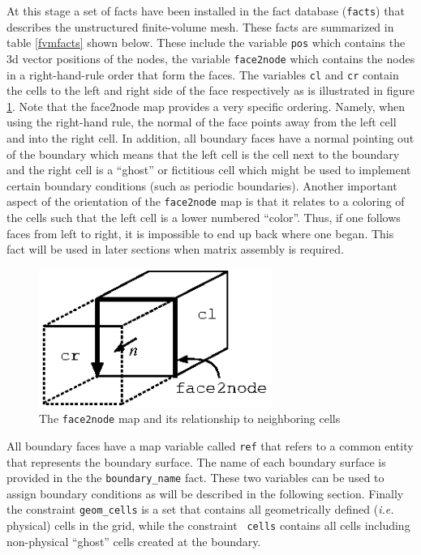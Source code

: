 \documentclass[10pt,epsf,letterpaper,twoside]{book}
\begin{document}
At this stage a set of facts have been installed in the fact database
({\tt facts}) that describes the unstructured finite-volume mesh.
These facts are summarized in table \ref{fvmfacts} shown below.  These
include the variable {\tt pos} which contains the 3d vector positions
of the nodes, the variable {\tt face2node} which contains the nodes in
a right-hand-rule order that form the faces.  The variables {\tt cl}
and {\tt cr} contain the cells to the left and right side of the face
respectively as is illustrated in figure \ref{face2node}.  Note that
the face2node map provides a very specific ordering.  Namely, when
using the right-hand rule, the normal of the face points away from the
left cell and into the right cell.  In addition, all boundary faces
have a normal pointing out of the boundary which means that the left
cell is the cell next to the boundary and the right cell is a
``ghost'' or fictitious cell which might be used to implement certain
boundary conditions (such as periodic boundaries).  Another important
aspect of the orientation of the {\tt face2node} map is that it
relates to a coloring of the cells such that the left cell is a lower
numbered ``color''.  Thus, if one follows faces from left to right, it
is impossible to end up back where one began.  This fact will be used
in later sections when matrix assembly is required.

\begin{figure}[htbp]
 \centerline{
\includegraphics[width=3in]{figures/face.eps}}
 \caption{The {\tt face2node} map and its relationship to neighboring cells}
 \label{face2node}
\end{figure}

All boundary faces have a map variable called {\tt ref} that refers to
a common entity that represents the boundary surface.  The name of
each boundary surface is provided in the the {\tt boundary\_name}
fact.  These two variables can be used to assign boundary conditions
as will be described in the following section.  Finally the constraint
{\tt geom\_cells} is a set that contains all geometrically defined
({\it i.e.} physical) cells in the grid, while the constraint {\tt
  cells} contains all cells including non-physical ``ghost'' cells
created at the boundary.
\end{document}
